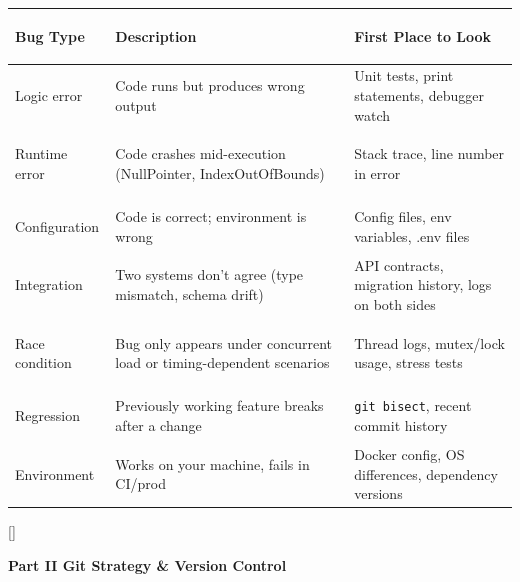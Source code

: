 \documentclass[11pt, letterpaper]{article}
\newcommand{\greysections}{%
  \titleformat{\section}{\large\bfseries\color{sectiongrey}}{}{0em}{}[\color{sectiongrey}\titlerule]%
  \titleformat{\subsection}{\normalsize\bfseries\color{sectiongrey!80!black}}{}{0em}{}%
}
\newcommand{\partbanner}[3]{%
  \begin{tcolorbox}[colback=#1, colframe=#2, boxrule=1.2pt, arc=4pt,
    left=8pt, right=8pt, top=6pt, bottom=6pt]
    \begin{center}{\LARGE\bfseries #3}\end{center}
  \end{tcolorbox}%
}
\begin{document}
\noindent
{\renewcommand{\arraystretch}{1.6}
\begin{tabularx}{\textwidth}{>{\bfseries\raggedright\arraybackslash}p{3.5cm}
                              >{\raggedright\arraybackslash}X
                              >{\raggedright\arraybackslash}p{3.8cm}}
\toprule
\rowcolor{tableheaderpurple}
\textbf{Bug Type} & \textbf{Description} & \textbf{First Place to Look} \\
\midrule
\rowcolor{rowPu} Logic error      & Code runs but produces wrong output & Unit tests, print statements, debugger watch \\
\rowcolor{rowA}  Runtime error    & Code crashes mid-execution (NullPointer, IndexOutOfBounds) & Stack trace, line number in error \\
\rowcolor{rowPu} Configuration    & Code is correct; environment is wrong & Config files, env variables, .env files \\
\rowcolor{rowA}  Integration      & Two systems don't agree (type mismatch, schema drift) & API contracts, migration history, logs on both sides \\
\rowcolor{rowPu} Race condition   & Bug only appears under concurrent load or timing-dependent scenarios & Thread logs, mutex/lock usage, stress tests \\
\rowcolor{rowA}  Regression       & Previously working feature breaks after a change & \texttt{git bisect}, recent commit history \\
\rowcolor{rowPu} Environment      & Works on your machine, fails in CI/prod & Docker config, OS differences, dependency versions \\
\bottomrule
\end{tabularx}}

\newpage

\greysections
{}
\partbanner{part7bg}{sectiongrey}{Part II \quad Git Strategy \& Version Control}
\end{document}
